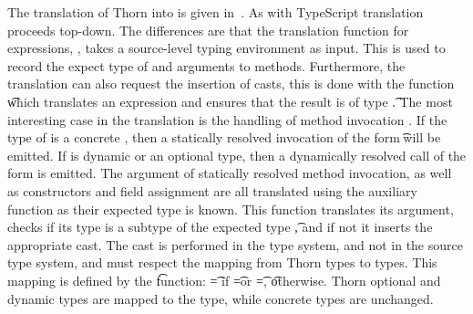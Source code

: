 \documentclass{tex/llncs}
\begin{document}
The translation of Thorn into \kafka is given in~. As with
TypeScript translation proceeds top-down. The differences are that the
translation function for expressions, \TRG{\e}\Env, takes a source-level
typing environment as input. This is used to record the expect type of \this
and arguments \x to methods. Furthermore, the translation can also request
the insertion of casts, this is done with the function \TAG{\e}\Env\t which
translates an expression and ensures that the result is of type \t. The most
interesting case in the translation is the handling of method invocation
\Call\e\m\ep. If the type of \e is a concrete \C, then a statically resolved
invocation of the form \KCall\e\m\ep\t\tp will be emitted. If \e is dynamic
or an optional type, then a dynamically resolved call of the form
\DynCall\e\m\ep is emitted.  The argument of statically resolved method
invocation, as well as constructors and field assignment are all translated
using the auxiliary function as their expected type is known.  This function
translates its argument, checks if its type is a subtype of the expected
type \t, and if not it inserts the appropriate cast.  The cast is performed
in the \kafka type system, and not in the source type system, and must
respect the mapping from Thorn types to \kafka types.  This mapping is
defined by the \kty\t function: \kty\t = \any if \t=\dt\C or \t=\any, \t
otherwise.  Thorn optional and dynamic types are mapped to the \any type,
while concrete types are unchanged.
\end{document}
